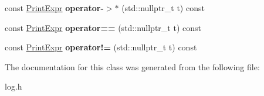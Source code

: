 \begin{DoxyCompactItemize}
\item 
\hypertarget{classPrintExpr_ab0ae1579a1ae2d291d1670b164344b25}{const \hyperlink{classPrintExpr}{Print\-Expr} {\bfseries operator-\/$>$$\ast$} (std\-::nullptr\-\_\-t t) const }\label{classPrintExpr_ab0ae1579a1ae2d291d1670b164344b25}

\item 
\hypertarget{classPrintExpr_ae04e978fc3ae6a32ead1e5cdee461574}{const \hyperlink{classPrintExpr}{Print\-Expr} {\bfseries operator==} (std\-::nullptr\-\_\-t t) const }\label{classPrintExpr_ae04e978fc3ae6a32ead1e5cdee461574}

\item 
\hypertarget{classPrintExpr_afe8557361178282251c441176d962140}{const \hyperlink{classPrintExpr}{Print\-Expr} {\bfseries operator!=} (std\-::nullptr\-\_\-t t) const }\label{classPrintExpr_afe8557361178282251c441176d962140}

\end{DoxyCompactItemize}


The documentation for this class was generated from the following file\-:\begin{DoxyCompactItemize}
\item 
log.\-h\end{DoxyCompactItemize}
